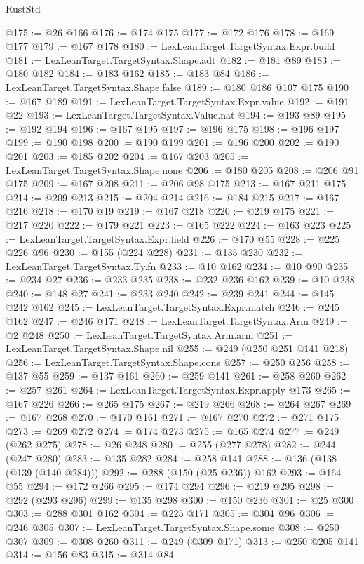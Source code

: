 \begin{lexlean}{RustStd}
\begin{coremodule}
{\begin{coremodule}
{{{{{{{{{{{{{{{{{{{{{{{{{{{{{{{{{{@175 := @26 @166
@176 := @174 @175
@177 := @172 @176
@178 := @169 @177
@179 := @167 @178
@180 := LexLeanTarget.TargetSyntax.Expr.build
@181 := LexLeanTarget.TargetSyntax.Shape.adt
@182 := @181 @89
@183 := @180 @182
@184 := @183 @162
@185 := @183 @84
@186 := LexLeanTarget.TargetSyntax.Shape.false
@189 := @180 @186 @107 @175
@190 := @167 @189
@191 := LexLeanTarget.TargetSyntax.Expr.value
@192 := @191 @22
@193 := LexLeanTarget.TargetSyntax.Value.nat
@194 := @193 @89
@195 := @192 @194
@196 := @167 @195
@197 := @196 @175
@198 := @196 @197
@199 := @190 @198
@200 := @190 @199
@201 := @196 @200
@202 := @190 @201
@203 := @185 @202
@204 := @167 @203
@205 := LexLeanTarget.TargetSyntax.Shape.none
@206 := @180 @205
@208 := @206 @91 @175
@209 := @167 @208
@211 := @206 @98 @175
@213 := @167 @211 @175
@214 := @209 @213
@215 := @204 @214
@216 := @184 @215
@217 := @167 @216
@218 := @170 @19
@219 := @167 @218
@220 := @219 @175
@221 := @217 @220
@222 := @179 @221
@223 := @165 @222
@224 := @163 @223
@225 := LexLeanTarget.TargetSyntax.Expr.field
@226 := @170 @55
@228 := @225 @226 @96
@230 := @155 (@224 @228)
@231 := @135 @230
@232 := LexLeanTarget.TargetSyntax.Ty.fn
@233 := @10 @162
@234 := @10 @90
@235 := @234 @27
@236 := @233 @235
@238 := @232 @236 @162
@239 := @10 @238
@240 := @148 @27
@241 := @233 @240
@242 := @239 @241
@244 := @145 @242 @162
@245 := LexLeanTarget.TargetSyntax.Expr.match
@246 := @245 @162
@247 := @246 @171
@248 := LexLeanTarget.TargetSyntax.Arm
@249 := @2 @248
@250 := LexLeanTarget.TargetSyntax.Arm.arm
@251 := LexLeanTarget.TargetSyntax.Shape.nil
@255 := @249 (@250 @251 @141 @218)
@256 := LexLeanTarget.TargetSyntax.Shape.cons
@257 := @250 @256
@258 := @137 @55
@259 := @137 @161
@260 := @259 @141
@261 := @258 @260
@262 := @257 @261
@264 := LexLeanTarget.TargetSyntax.Expr.apply @173
@265 := @167 @226
@266 := @265 @175
@267 := @219 @266
@268 := @264 @267
@269 := @167 @268
@270 := @170 @161
@271 := @167 @270
@272 := @271 @175
@273 := @269 @272
@274 := @174 @273
@275 := @165 @274
@277 := @249 (@262 @275)
@278 := @26 @248
@280 := @255 (@277 @278)
@282 := @244 (@247 @280)
@283 := @135 @282
@284 := @258 @141
@288 := @136 (@138 (@139 (@140 @284)))
@292 := @288 (@150 (@25 @236)) @162
@293 := @164 @55
@294 := @172 @266
@295 := @174 @294
@296 := @219 @295
@298 := @292 (@293 @296)
@299 := @135 @298
@300 := @150 @236
@301 := @25 @300
@303 := @288 @301 @162
@304 := @225 @171
@305 := @304 @96
@306 := @246 @305
@307 := LexLeanTarget.TargetSyntax.Shape.some
@308 := @250 @307
@309 := @308 @260
@311 := @249 (@309 @171)
@313 := @250 @205 @141
@314 := @156 @83
@315 := @314 @84
}}}}}}}}}}}}}}}}}}}}}}}}}}}}}}}}}}
\end{coremodule}}
\end{coremodule}
\end{lexlean}
